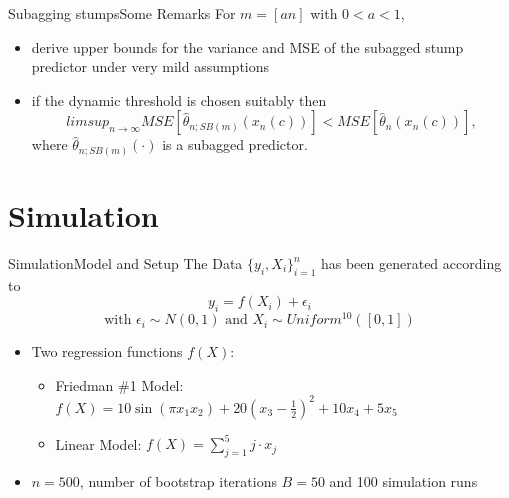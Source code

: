 \documentclass{beamer}
\begin{document}
\begin{frame}{Subagging stumps}{Some Remarks}
For $m = [an]$ with $0 < a < 1$,
\begin{itemize}
\item derive upper bounds for the variance and MSE of the subagged stump predictor under very mild assumptions
\item if the dynamic threshold is chosen suitably then 
$$
limsup_{n \rightarrow \infty}MSE[\hat{\theta}_{n;SB(m)}(x_{n}(c))] < MSE[\hat{\theta}_{n}(x_{n}(c))],
$$
where $\hat{\theta}_{n;SB(m)}(\cdot)$ is a subagged predictor.


\end{itemize}

\end{frame}



\section{Simulation}


\begin{frame}{Simulation}{Model and Setup}
The Data $\{y_{i},X_{i} \}_{i=1}^{n}$ has been generated according to $$y_{i} = f(X_{i}) + \epsilon_{i}$$
$$\text{with }\epsilon_{i} \sim N(0,1) \text{ and } X_{i} \sim Uniform^{10}([0,1])$$
\begin{itemize}
\item Two regression functions $f(X)$:
\begin{itemize}
\item Friedman \#1 Model: $f(X) = 10 \sin(\pi x_{1} x_{2}) + 20(x_{3} - \frac{1}{2})^{2} + 10 x_{4} + 5 x_{5} $
\item Linear Model: \hspace{9mm} $f(X) = \sum_{j=1}^{5} j \cdot x_{j} $
\end{itemize}
\item $n=500$, number of bootstrap iterations $B=50$ and 100 simulation runs
\end{itemize}


\end{frame}
\end{document}
